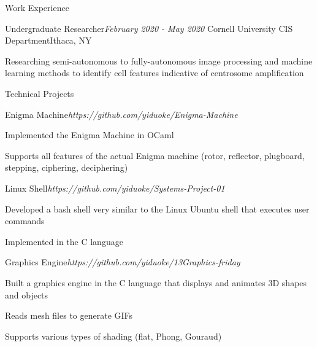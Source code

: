 \documentclass{resume} %
\begin{document}
\begin{rSection}{Work Experience}
\begin{rSubsection}{Undergraduate Researcher}{\em February 2020 - May 2020 }{Cornell University CIS Department}{Ithaca, NY}
\item Researching semi-autonomous to fully-autonomous image processing and machine learning methods to identify cell features indicative of centrosome amplification
\end{rSubsection}


\end{rSection}

\begin{rSection}{Technical Projects}


\begin{rSubsection}{Enigma Machine}{\em https://github.com/yiduoke/Enigma-Machine}{}{}
\item Implemented the Enigma Machine in OCaml
\item Supports all features of the actual Enigma machine (rotor, reflector, plugboard, stepping, ciphering, deciphering)
\end{rSubsection}

\begin{rSubsection}{Linux Shell}{\em https://github.com/yiduoke/Systems-Project-01}{}{}
\item Developed a bash shell very similar to the Linux Ubuntu shell that executes user commands
\item Implemented in the C language
\end{rSubsection}

\begin{rSubsection}{Graphics Engine}{\em https://github.com/yiduoke/13Graphics-friday}{}{}
\item Built a graphics engine in the C language that displays and animates 3D shapes and objects
\item Reads mesh files to generate GIFs
\item Supports various types of shading (flat, Phong, Gouraud)
\end{rSubsection}


\end{rSection}
\end{document}
